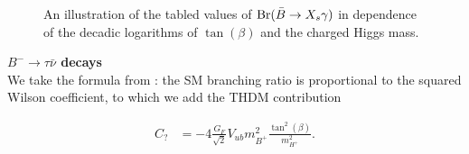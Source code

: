 \documentclass[aps,superscriptaddress,nofootinbib,floatfix,notitlepage]{revtex4-1}
\begin{document}
\begin{figure}
  \centering
  \caption{An illustration of the tabled values of ${\rm Br}(\bar{B}\to X_s\gamma)$ in dependence of the decadic logarithms of $\tan (\beta)$ and the charged Higgs mass.}
  \label{fig:THDMbsgplot}
\end{figure}

\textbf{$B^-\to \tau \bar{\nu}$ decays}\\

We take the formula from \cite{Hou:1992sy}: the SM branching ratio is proportional to the squared Wilson coefficient, to which we add the THDM contribution

\begin{align}
 C_? &= -4 \frac{G_F}{\sqrt{2}} V_{ub} m_{B^+}^2 \frac{\tan ^2 (\beta)}{m_{H^+}^2}. \nonumber
\end{align}
\end{document}
